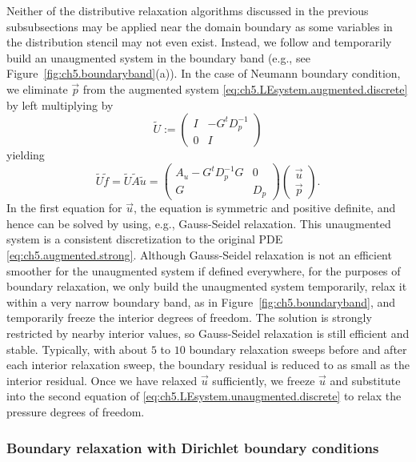 Neither of the distributive relaxation algorithms discussed in the previous subsubsections may be applied near the domain boundary as some variables in the distribution stencil may not even exist. Instead, we follow \cite{Zhu.Yongning10} and temporarily build an unaugmented system in the boundary band (e.g., see Figure~\ref{fig:ch5.boundaryband}(a)). In the case of Neumann boundary condition, we eliminate $\vec{p}$ from the augmented system \eqref{eq:ch5.LEsystem.augmented.discrete} by left multiplying by
\begin{equation*}
\tilde{U} := \begin{pmatrix} I & -G^t D_p^{-1} \\ 0 & I \end{pmatrix}
\end{equation*}
yielding
\begin{equation} \label{eq:ch5.LEsystem.unaugmented.discrete}
\tilde{U} \tilde{f} = \tilde{U} \tilde{A} \tilde{u} =
\begin{pmatrix} A_u - G^t D_p^{-1} G & 0 \\ G & D_p \end{pmatrix}
\begin{pmatrix} \vec{u} \\ \vec{p} \end{pmatrix}.
\end{equation}
In the first equation for $\vec{u}$, the equation is symmetric and positive definite, and hence can be solved by using, e.g., Gauss-Seidel relaxation. This unaugmented system is a consistent discretization to the original PDE \eqref{eq:ch5.augmented.strong}. Although Gauss-Seidel relaxation is not an efficient smoother for the unaugmented system if defined everywhere, for the purposes of boundary relaxation, we only build the unaugmented system temporarily, relax it within a very narrow boundary band, as in Figure~\ref{fig:ch5.boundaryband}, and temporarily freeze the interior degrees of freedom. The solution is strongly restricted by nearby interior values, so Gauss-Seidel relaxation is still efficient and stable. Typically, with about $5$ to $10$ boundary relaxation sweeps before and after each interior relaxation sweep, the boundary residual is reduced to as small as the interior residual. Once we have relaxed $\vec{u}$ sufficiently, we freeze $\vec{u}$ and substitute into the second equation of \eqref{eq:ch5.LEsystem.unaugmented.discrete} to relax the pressure degrees of freedom.

\subsubsection{Boundary relaxation with Dirichlet boundary conditions}

